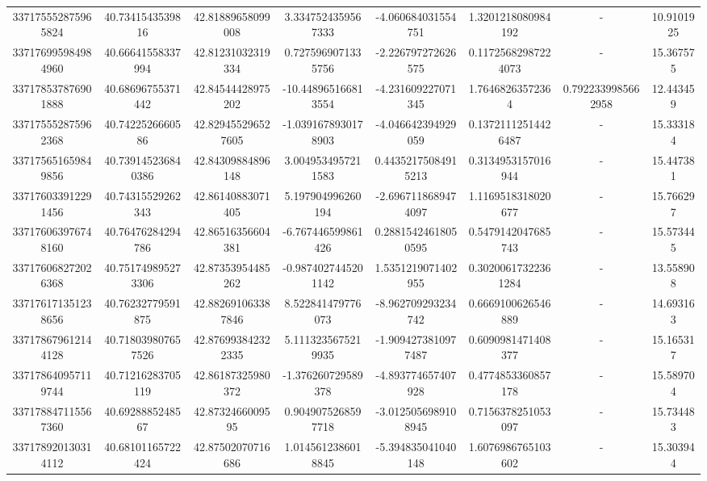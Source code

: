 \documentclass{article}
\begin{document}
\begin{landscape}
\begin{longtable}[c]{S[table-format=18.0]S[table-format=2.15]S[table-format=2.15]S[table-format=-2.17]S[table-format=-2.16]S[table-format=-2.16]S[table-format=-3.16]S[table-format=2.7]}
337175552875965824 & 40.7341543539816   & 42.81889658099008  & 3.3347524359567333    & -4.060684031554751   & 1.3201218080984192   & {-}                  & 10.9101925 \\
337176995984984960 & 40.66641558337994  & 42.81231032319334  & 0.7275969071335756    & -2.226797272626575   & 0.11725682987224073  & {-}                  & 15.367575  \\
337178537876901888 & 40.68696755371442  & 42.84544428975202  & -10.448965166813554   & -4.231609227071345   & 1.76468263572364     & 0.7922339985662958  & 12.443459  \\
337175552875962368 & 40.7422526660586   & 42.829455296527605 & -1.0391678930178903   & -4.046642394929059   & 0.13721112514426487  & {-}                  & 15.333184  \\
337175651659849856 & 40.739145236840386 & 42.84309884896148  & 3.0049534957211583    & 0.44352175084915213  & 0.3134953157016944   & {-}                  & 15.447381  \\
337176033912291456 & 40.74315529262343  & 42.86140883071405  & 5.197904996260194     & -2.6967118689474097  & 1.1169518318020677   & {-}                  & 15.766297  \\
337176063976748160 & 40.76476284294786  & 42.86516356604381  & -6.767446599861426    & 0.28815424618050595  & 0.5479142047685743   & {-}                  & 15.573445  \\
337176068272026368 & 40.751749895273306 & 42.87353954485262  & -0.9874027445201142   & 1.5351219071402955   & 0.30200617322361284  & {-}                  & 13.558908  \\
337176171351238656 & 40.76232779591875  & 42.882691063387846 & 8.522841479776073     & -8.962709293234742   & 0.6669100626546889   & {-}                  & 14.693163  \\
337178679612144128 & 40.718039807657526 & 42.876993842322335 & 5.1113235675219935    & -1.9094273810977487  & 0.6090981471408377   & {-}                  & 15.165317  \\
337178640957119744 & 40.71216283705119  & 42.86187325980372  & -1.376260729589378    & -4.893774657407928   & 0.4774853360857178   & {-}                  & 15.589704  \\
337178847115567360 & 40.6928885248567   & 42.8732466009595   & 0.9049075268597718    & -3.0125056989108945  & 0.7156378251053097   & {-}                  & 15.734483  \\
337178920130314112 & 40.68101165722424  & 42.87502070716686  & 1.0145612386018845    & -5.394835041040148   & 1.6076986765103602   & {-}                  & 15.303944  \\

\end{longtable}
\end{landscape}
\end{document}
